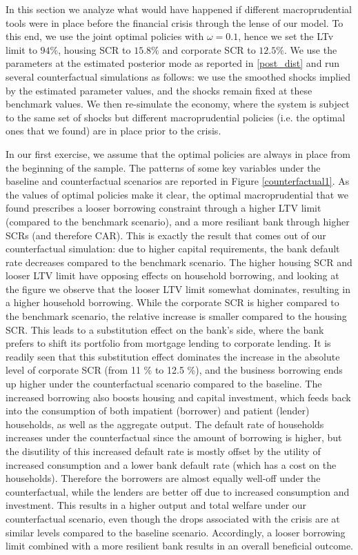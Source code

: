 \documentclass[12pt]{article}
\numberwithin{equation}{section}
\begin{document}
In this section we analyze what would have happened if different macroprudential tools were in place before the financial crisis through the lense of our model. To this end, we use the joint optimal policies with $\omega=0.1$, hence we set the LTv limit to $94\%$, housing SCR to $15.8 \%$ and corporate SCR to $12.5 \%$. We use the parameters at the estimated posterior mode as reported in \ref{post_dist} and run several counterfactual simulations as follows: we use the smoothed shocks implied by the estimated parameter values, and the shocks remain fixed at these benchmark values. We then re-simulate the economy, where the system is subject to the same set of shocks but different macroprudential policies (i.e. the optimal ones that we found) are in place prior to the crisis. 

In our first exercise, we assume that the optimal policies are always in place from the beginning of the sample. The patterns of some key variables under the baseline and counterfactual scenarios are reported in Figure \ref{counterfactual1}. As the values of optimal policies make it clear, the optimal macroprudential that we found prescribes a looser borrowing constraint through a higher LTV limit (compared to the benchmark scenario), and a more resiliant bank through higher SCRs (and therefore CAR). This is exactly the result that comes out of our counterfactual simulation: due to higher capital requirements, the bank default rate decreases compared to the benchmark scenario. The higher housing SCR and looser LTV limit have opposing effects on household borrowing, and looking at the figure we observe that the looser LTV limit somewhat dominates, resulting in a higher household borrowing. While the corporate SCR is higher compared to the benchmark scenario, the relative increase is smaller compared to the housing SCR. This leads to a substitution effect on the bank's side, where the bank prefers to shift its portfolio from mortgage lending to corporate lending. It is readily seen that this substitution effect dominates the increase in the absolute level of corporate SCR (from 11 \% to 12.5 \%), and the business borrowing ends up higher under the counterfactual scenario compared to the baseline. The increased borrowing also boosts housing and capital investment, which feeds back into the consumption of both impatient (borrower) and patient (lender) households, as well as the aggregate output. The default rate of households increases under the counterfactual since the amount of borrowing is higher, but the disutility of this increased default rate is mostly offset by the utility of increased consumption and a lower bank default rate (which has a cost on the households). Therefore the borrowers are almost equally well-off under the counterfactual, while the lenders are better off due to increased consumption and investment. This results in a higher output and total welfare under our counterfactual scenario, even though the drops associated with the crisis are at similar levels compared to the baseline scenario. Accordingly, a looser borrowing limit combined with a more resilient bank results in an overall beneficial outcome. 
\end{document}
